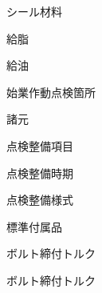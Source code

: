\documentclass[11pt, a4paper]{ltjsarticle}
\begin{document}
% 
% 
% 

% 

\newpage
シール材料


\newpage
給脂


\newpage
給油


\newpage
始業作動点検箇所


\newpage
諸元


\newpage
点検整備項目


\newpage
点検整備時期


\newpage
点検整備様式



\newpage
標準付属品


\newpage
ボルト締付トルク


\newpage
ボルト締付トルク

\end{document}
